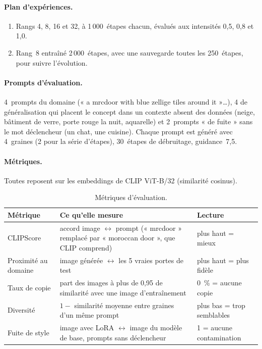 \documentclass[11pt,a4paper]{article}
\begin{document}
\paragraph{Plan d'expériences.}
\begin{enumerate}
  \item Rangs 4, 8, 16 et 32, à 1\,000~étapes chacun, évalués aux intensités 0,5, 0,8 et 1,0.
  \item Rang~8 entraîné 2\,000~étapes, avec une sauvegarde toutes les 250~étapes, pour suivre l'évolution.
\end{enumerate}

\paragraph{Prompts d'évaluation.} 4~prompts du domaine (« a mrcdoor with blue zellige tiles around it »\ldots), 4 de généralisation qui placent le concept dans un contexte absent des données (neige, bâtiment de verre, porte rouge la nuit, aquarelle) et 2~prompts « de fuite » sans le mot déclencheur (un chat, une cuisine). Chaque prompt est généré avec 4~graines (2 pour la série d'étapes), 30~étapes de débruitage, guidance~7,5.

\paragraph{Métriques.} Toutes reposent sur les embeddings de CLIP ViT-B/32 (similarité cosinus).

\begin{table}[H]
  \centering
  \caption{Métriques d'évaluation.}
  \small
  \begin{tabularx}{\linewidth}{l Y l}
    \toprule
    Métrique & Ce qu'elle mesure & Lecture \\
    \midrule
    CLIPScore & accord image $\leftrightarrow$ prompt (« mrcdoor » remplacé par « moroccan door », que CLIP comprend) & plus haut = mieux \\
    Proximité au domaine & image générée $\leftrightarrow$ les 5 vraies portes de test & plus haut = plus fidèle \\
    Taux de copie & part des images à plus de 0,95 de similarité avec une image d'entraînement & 0~\% = aucune copie \\
    Diversité & $1 -$ similarité moyenne entre graines d'un même prompt & plus bas = trop semblables \\
    Fuite de style & image avec LoRA $\leftrightarrow$ image du modèle de base, prompts sans déclencheur & 1 = aucune contamination \\
    \bottomrule
  \end{tabularx}
\end{table}
\end{document}
